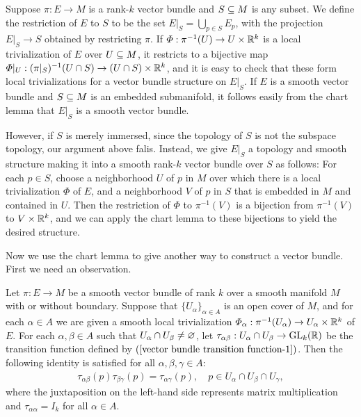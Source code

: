 \begin{example}
Suppose $\pi:E\to M$ is a rank-$k$ vector bundle and $S\subseteq M$ is any subset. We define the restriction of $E$ to $S$ to be the set $E|_S=\bigcup_{p\in S}E_p$, with the projection $E|_S\to S$ obtained by restricting $\pi$. If $\varPhi:\pi^{-1}(U)\to U\times\mathbb{R}^k$ is a local trivialization of $E$ over $U\subseteq M$, it restricts to a bijective map $\varPhi|_U:(\pi|_S)^{-1}(U\cap S)\to (U\cap S)\times\mathbb{R}^k$, and it is easy to check that these form local trivializations for a vector bundle structure on $E|_S$. If $E$ is a smooth vector bundle and $S\subseteq M$ is an embedded submanifold, it follows easily from the chart lemma that $E|_S$ is a smooth vector bundle.\par 
However, if $S$ is merely immersed, since the topology of $S$ is not the subspace topology, our argument above falis. Instead, we give $E|_S$ a topology and smooth structure making it into a smooth rank-$k$ vector bundle over $S$ as follows: For each $p\in S$, choose a neighborhood $U$ of $p$ in $M$ over which there is a local trivialization $\varPhi$ of $E$, and a neighborhood $V$ of $p$ in $S$ that is embedded in $M$ and contained in $U$. Then the restriction of $\varPhi$ to $\pi^{-1}(V)$ is a bijection from $\pi^{-1}(V)$ to $V\times\mathbb{R}^k$, and we can apply the chart lemma to these bijections to yield the desired structure.
\end{example}
Now we use the chart lemma to give another way to construct a vector bundle. First we need an observation.
\begin{lemma}\label{vector bundle cochain prop}
Let $\pi:E\to M$ be a smooth vector bundle of rank $k$ over a smooth manifold $M$ with or without boundary. Suppose that $\{U_\alpha\}_{\alpha\in A}$ is an open 
cover of $M$, and for each $\alpha\in A$ we are given a smooth local trivialization $\varPhi_\alpha:\pi^{-1}(U_\alpha)\to U_\alpha\times\mathbb{R}^k$ of $E$. For 
each $\alpha,\beta\in A$ such that $U_\alpha\cap U_\beta\neq\varnothing$, let $\tau_{\alpha\beta}:U_{\alpha}\cap U_{\beta}\to\mathrm{GL}_k(\mathbb{R})$ be the transition function 
defined by $(\ref{vector bundle transition function-1})$. Then the following identity is satisfied for all $\alpha,\beta,\gamma\in A$:
\begin{align}\label{vector bundle transition function-2}
\tau_{\alpha\beta}(p)\tau_{\beta\gamma}(p)=\tau_{\alpha\gamma}(p),\quad p\in U_\alpha\cap U_\beta\cap U_\gamma,
\end{align}
where the juxtaposition on the left-hand side represents matrix multiplication and $\tau_{\alpha\alpha}=I_k$ for all $\alpha\in A$.
\end{lemma}
